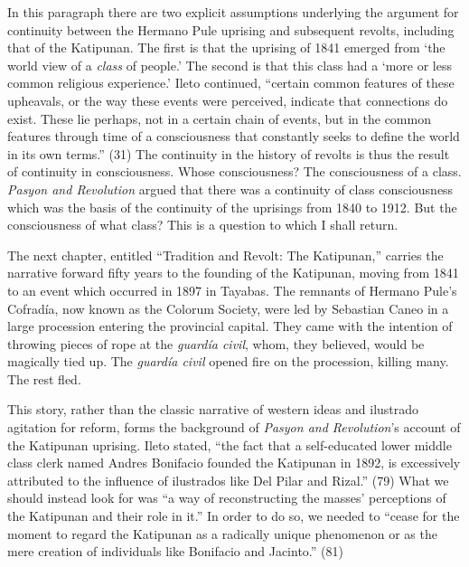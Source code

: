 In this paragraph there are two explicit assumptions underlying the argument for continuity between the Hermano Pule uprising and subsequent revolts, including that of the Katipunan. The first is that the uprising of 1841 emerged from \enquote*{the world view of a \textit{class} of people.} The second is that this class had a \enquote*{more or less common religious experience.} Ileto continued, \enquote{certain common features of these upheavals, or the way these events were perceived, indicate that connections do exist. These lie perhaps, not in a certain chain of events, but in the common features through time of a consciousness that constantly seeks to define the world in its own terms.} (31) The continuity in the history of revolts is thus the result of continuity in consciousness. Whose consciousness? The consciousness of a class. \textit{Pasyon and Revolution} argued that there was a continuity of class consciousness which was the basis of the continuity of the uprisings from 1840 to 1912. But the consciousness of what class? This is a question to which I shall return.

The next chapter, entitled \enquote{Tradition and Revolt: The Katipunan,} carries the narrative forward fifty years to the founding of the Katipunan, moving from 1841 to an event which occurred in 1897 in Tayabas. The remnants of Hermano Pule's Cofrad\'ia, now known as the Colorum Society, were led by Sebastian Caneo in a large procession entering the provincial capital. They came with the intention of throwing pieces of rope at the \textit{guard\'ia civil}, whom, they believed, would be magically tied up. The \textit{guard\'ia civil} opened fire on the procession, killing many. The rest fled.

This story, rather than the classic narrative of western ideas and ilustrado agitation for reform, forms the background of \textit{Pasyon and Revolution}’s account of the Katipunan uprising. Ileto stated, \enquote{the fact that a self-educated lower middle class clerk named Andres Bonifacio founded the Katipunan in 1892, is excessively attributed to the influence of ilustrados like Del Pilar and Rizal.} (79) What we should instead look for was \enquote{a way of reconstructing the masses' perceptions of the Katipunan and their role in it.} In order to do so, we needed to \enquote{cease for the moment to regard the Katipunan as a radically unique phenomenon or as the mere creation of individuals like Bonifacio and Jacinto.} (81)

